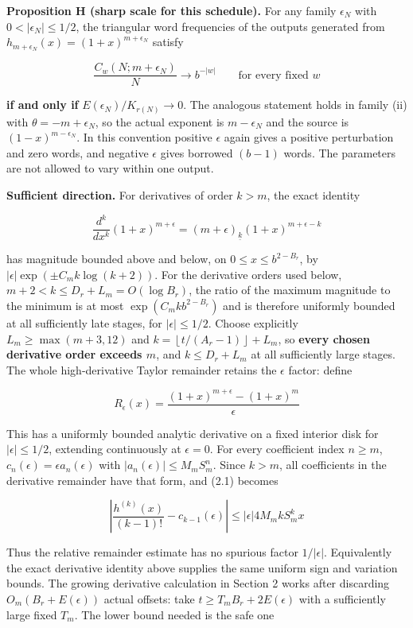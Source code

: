 \documentclass[11pt,a4paper]{article}
\begin{document}
\textbf{Proposition H (sharp scale for this schedule).} For any family
\(\epsilon_N\) with \(0< |\epsilon_N|\le 1/2\), the triangular word
frequencies of the outputs generated from
\(h_{m+\epsilon_N}(x)=(1+x)^{m+\epsilon_N}\) satisfy

\[
\frac{C_w(N;m+\epsilon_N)}{N} \to  b^{-|w|}\qquad\text{for every fixed }w
\]

\textbf{if and only if} \(E(\epsilon_N)/K_{r(N)} \to  0\). The analogous
statement holds in family (ii) with \(\theta=-m+\epsilon_N\), so the
actual exponent is \(m-\epsilon_N\) and the source is
\((1-x)^{m-\epsilon_N}\). In this convention positive \(\epsilon\) again
gives a positive perturbation and zero words, and negative \(\epsilon\)
gives borrowed \((b-1)\) words. The parameters are not allowed to vary
within one output.

\textbf{Sufficient direction.} For derivatives of order \(k>m\), the
exact identity

\[
\frac{d^k}{dx^k} (1+x)^{m+\epsilon} = (m+\epsilon)_{\underline{k}}(1+x)^{m+\epsilon-k}
\]

has magnitude bounded above and below, on \(0\le x\le b^{2-B_r}\), by
\(|\epsilon| \exp(\pm C_m k \log(k+2))\). For the derivative orders used
below, \(m+2< k\le D_r+L_m=O(\log B_r)\), the ratio of the maximum
magnitude to the minimum is at most \(\exp(C_m k b^{2-B_r})\) and is
therefore uniformly bounded at all sufficiently late stages, for
\(|\epsilon|\le1/2\). Choose explicitly \(L_m\ge \max(m+3,12)\) and
\(k=\left\lfloor t/(A_r-1)\right\rfloor+L_m\), so \textbf{every chosen
derivative order exceeds \(m\)}, and \(k\le D_r+L_m\) at all
sufficiently large stages. The whole high-derivative Taylor remainder
retains the \(\epsilon\) factor: define

\[
R_\epsilon(x)=\frac{(1+x)^{m+\epsilon}-(1+x)^m}{\epsilon}
\]

This has a uniformly bounded analytic derivative on a fixed interior
disk for \(|\epsilon|\le 1/2\), extending continuously at
\(\epsilon=0\). For every coefficient index \(n\ge m\),
\(c_n(\epsilon)=\epsilon a_n(\epsilon)\) with
\(|a_n(\epsilon)|\le M_m S_m^n\). Since \(k>m\), all coefficients in the
derivative remainder have that form, and (2.1) becomes

\[
\left|\frac{h^{(k)}(x)}{(k-1)!}-c_{k-1}(\epsilon)\right| \le  |\epsilon| 4 M_m k S_m^k x
\]

Thus the relative remainder estimate has no spurious factor
\(1/|\epsilon|\). Equivalently the exact derivative identity above
supplies the same uniform sign and variation bounds. The growing
derivative calculation in Section 2 works after discarding
\(O_m(B_r+E(\epsilon))\) actual offsets: take
\(t\ge T_m B_r+2 E(\epsilon)\) with a sufficiently large fixed \(T_m\).
The lower bound needed is the safe one
\end{document}

